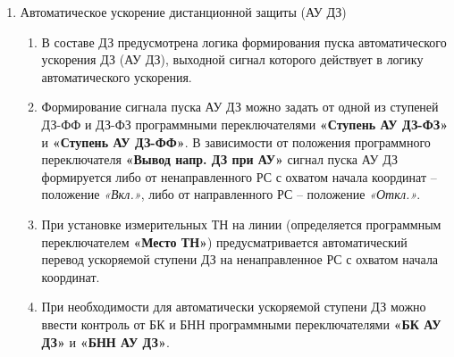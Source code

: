 \begin{enumerate}[label=\arabic{section}.\arabic{subsection}.\arabic{enumi}, labelsep=4pt, leftmargin=0pt, itemindent=57pt, itemsep=0pt, parsep=5pt]
\begin{enumerate}[label=\arabic{section}.\arabic{subsection}.\arabic{enumi}.\arabic*, labelsep=4pt, leftmargin=0em, itemindent=65pt, parsep=0pt]
\item
Контроль ступеней ДЗ от блокировки при качаниях вводится программными переключателями \textbf{«БК ДЗ-ФФ(ФЗ)-N»}, имеющими четыре положения:
\begin{enumerate}[label=\arabic*)]
\item \textit{Откл.} -- ступень работает без контроля от БК;
\item \textit{БК-I-б} -- ступень пускается от сигнала ввода быстродействующих ступеней;
\item \textit{БК-I-м} -- ступень пускается от сигнала ввода медленнодействующих ступеней;
\item \textit{БК-Z} -- ступень пускается от сигнала БК по скорости изменения величины сопротивления.
\end{enumerate}
\end{enumerate}


\item\label{sec:secau} Автоматическое ускорение дистанционной защиты (АУ ДЗ)
\begin{enumerate}[label=\arabic{section}.\arabic{subsection}.\arabic{enumi}.\arabic*, labelsep=4pt, leftmargin=0em, itemindent=65pt, parsep=0pt]

\item
В составе ДЗ предусмотрена логика формирования пуска автоматического ускорения ДЗ (АУ ДЗ), выходной сигнал которого действует в логику автоматического ускорения. 
\item
Формирование сигнала пуска АУ ДЗ можно задать от одной из ступеней ДЗ-ФФ и ДЗ-ФЗ программными переключателями \textbf{«Ступень АУ ДЗ-ФЗ»} и \textbf{«Ступень АУ ДЗ-ФФ»}. В зависимости от положения программного переключателя \textbf{«Вывод напр. ДЗ при АУ»} сигнал пуска АУ ДЗ формируется либо от ненаправленного РС с охватом начала координат – положение \textit{«Вкл.»}, либо от направленного РС – положение \textit{«Откл.»}.

\item
При установке измерительных ТН на линии (определяется программным переключателем \textbf{«Место ТН»}) предусматривается автоматический перевод ускоряемой ступени ДЗ на ненаправленное РС с охватом начала координат.

\item
При необходимости для автоматически ускоряемой ступени ДЗ можно ввести контроль от БК и БНН программными переключателями \textbf{«БК АУ ДЗ»} и \textbf{«БНН АУ ДЗ»}.


\end{enumerate}
\end{enumerate}

